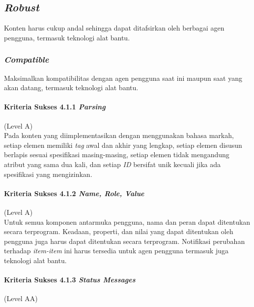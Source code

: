 \documentclass[a4paper,twoside]{article}
\begin{document}
\begin{enumerate}

		\subsection*{\textit{Robust}}
		\label{sec:robust}
		Konten harus cukup andal sehingga dapat ditafsirkan oleh berbagai agen pengguna, termasuk teknologi alat bantu.

		\subsubsection*{\textit{Compatible}}
		\label{sec:compatible}
		Maksimalkan kompatibilitas dengan agen pengguna saat ini maupun saat yang akan datang, termasuk teknologi alat bantu.

		\paragraph{Kriteria Sukses 4.1.1 \textit{Parsing}}
		\label{sec:kriteria_sukses_4.1.1}
		(Level A)\\

		Pada konten yang diimplementasikan dengan menggunakan bahasa markah, setiap elemen memiliki \textit{tag} awal dan akhir yang lengkap, setiap elemen disusun berlapis sesuai spesifikasi masing-masing, setiap elemen tidak mengandung atribut yang sama dua kali, dan setiap \textit{ID} bersifat unik kecuali jika ada spesifikasi yang mengizinkan.

		\paragraph{Kriteria Sukses 4.1.2 \textit{Name, Role, Value}}
		\label{sec:kriteria_sukses_4.1.2}
		(Level A)\\

		Untuk semua komponen antarmuka pengguna, nama dan peran dapat ditentukan secara terprogram. Keadaan, properti, dan nilai yang dapat ditentukan oleh pengguna juga harus dapat ditentukan secara terprogram. Notifikasi perubahan terhadap \textit{item-item} ini harus tersedia untuk agen pengguna termasuk juga teknologi alat bantu.

		\paragraph{Kriteria Sukses 4.1.3 \textit{Status Messages}}
		\label{sec:kriteria_sukses_4.1.3}
		(Level AA)\\


\end{enumerate}
\end{document}
